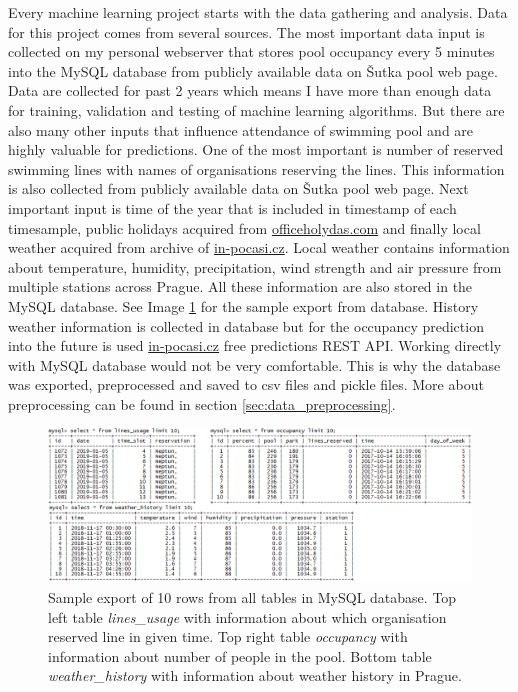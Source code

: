 \documentclass{article}
\begin{document}
Every machine learning project starts with the data gathering and analysis. Data for this project comes from several sources. The most important data input is collected on my personal webserver that stores pool occupancy every 5 minutes into the MySQL database from publicly available data on \v{S}utka pool web page. Data are collected for past 2 years which means I have more than enough data for training, validation and testing of machine learning algorithms. But there are also many other inputs that influence attendance of swimming pool and are highly valuable for predictions. One of the most important is number of reserved swimming lines with names of organisations reserving the lines. This information is also collected from publicly available data on \v{S}utka pool web page. Next important input is time of the year that is included in timestamp of each timesample, public holidays acquired from \href{https://www.officeholidays.com/countries/czech-republic}{officeholydas.com} and finally local weather acquired from archive of \href{https://www.in-pocasi.cz/archiv/}{in-pocasi.cz}. Local weather contains information about temperature, humidity, precipitation, wind strength and air pressure from multiple stations across Prague. All these information are also stored in the MySQL database. See Image \ref{fig:db_export} for the sample export from database. History weather information is collected in database but for the occupancy prediction into the future is  used \href{http://www.in-pocasi.cz/pocasi-na-web/}{in-pocasi.cz} free predictions REST API. Working directly with MySQL database would not be very comfortable. This is why the database was exported, preprocessed and saved to csv files and pickle files. More about preprocessing can be found in section \ref{sec:data_preprocessing}. 

\begin{figure}[h!]
\centering
\includegraphics[width=12cm]{imgs/db_export.png}
\caption{Sample export of 10 rows from all tables in MySQL database. Top left table \emph{lines\_usage} with information about which organisation reserved line in given time. Top right table \emph{occupancy} with information about number of people in the pool. Bottom table \emph{weather\_history} with information about weather history in Prague.}
\label{fig:db_export}
\end{figure}
\end{document}
